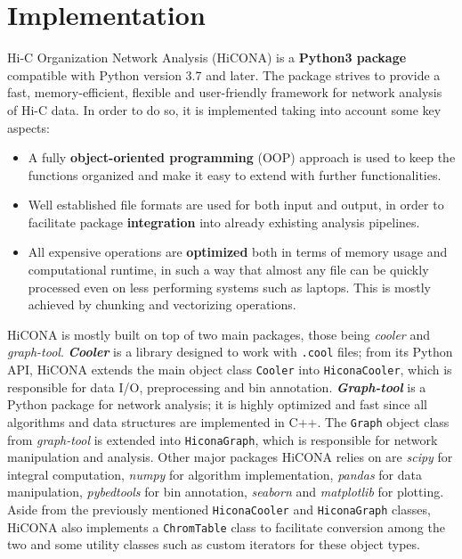 \section{Implementation}
Hi-C Organization Network Analysis (HiCONA) is a \textbf{Python3 package} compatible with Python version 3.7 and later. The package strives to provide a fast, memory-efficient, flexible and user-friendly framework for network analysis of Hi-C data. In order to do so, it is implemented taking into account some key aspects:
\begin{itemize}\tightlist
  \item A fully \textbf{object-oriented programming} (OOP) approach is used to keep the functions organized and make it easy to extend with further functionalities.
  \item Well established file formats are used for both input and output, in order to facilitate package \textbf{integration} into already exhisting analysis pipelines.
  \item All expensive operations are \textbf{optimized} both in terms of memory usage and computational runtime, in such a way that almost any file can be quickly processed even on less performing systems such as laptops. This is mostly achieved by chunking and vectorizing operations.
\end{itemize}
HiCONA is mostly built on top of two main packages, those being \emph{cooler} and \emph{graph-tool}. \textbf{\emph{Cooler}} is a library designed to work with \texttt{.cool} files\cite{cooler2020}; from its Python API, HiCONA extends the main object class \texttt{Cooler} into \texttt{HiconaCooler}, which is responsible for data I/O, preprocessing and bin annotation. \textbf{\emph{Graph-tool}} is a Python package for network analysis\cite{graphtool2014}; it is highly optimized and fast since all algorithms and data structures are implemented in C++. The \texttt{Graph} object class from \emph{graph-tool} is extended into \texttt{HiconaGraph}, which is responsible for network manipulation and analysis. Other major packages HiCONA relies on are \emph{scipy}\cite{scipy2020} for integral computation, \emph{numpy}\cite{numpy2020} for algorithm implementation, \emph{pandas}\cite{pandas2020} for data manipulation, \emph{pybedtools}\cite{pybedtools2011} for bin annotation, \emph{seaborn}\cite{seaborn2021} and \emph{matplotlib}\cite{matplotlib2007} for plotting. Aside from the previously mentioned \texttt{HiconaCooler} and \texttt{HiconaGraph} classes, HiCONA also implements a \texttt{ChromTable} class to facilitate conversion among the two and some utility classes such as custom iterators for these object types.

